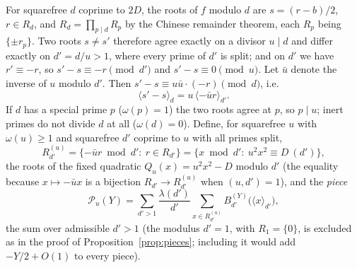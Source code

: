 \documentclass[11pt,a4paper]{article}
\theoremstyle{remark}\newtheorem{remark}[theorem]{Remark}
\newcommand{\rep}[2]{\langle #1\rangle_{#2}}
\begin{document}
For squarefree $d$ coprime to $2D$, the roots of $f$ modulo $d$ are $s=(r-b)/2$, $r\in R_d$, and $R_d=\prod_{p\mid d}R_p$
by the Chinese remainder theorem, each $R_p$ being $\{\pm r_p\}$. Two roots $s\ne s'$ therefore agree exactly on a
divisor $u\mid d$ and differ exactly on $d'=d/u>1$, where every prime of $d'$ is split; and on $d'$ we have
$r'\equiv-r$, so $s'-s\equiv-r\pmod{d'}$ and $s'-s\equiv0\pmod u$. Let $\bar u$ denote the inverse of $u$
modulo $d'$. Then $s'-s\equiv u\bar u\cdot(-r)\pmod d$, i.e.
\begin{equation}\label{eq:m}
\rep{s'-s}d=u\,\rep{-\bar ur}{d'} .
\end{equation}
If $d$ has a special prime $p$ ($\omega(p)=1$) the two roots agree at $p$, so $p\mid u$; inert primes do not divide $d$
at all ($\omega(d)=0$). Define, for squarefree $u$ with $\omega(u)\ge1$ and squarefree $d'$ coprime to $u$ with all primes
split,
\[
R^{(u)}_{d'}=\{-\bar ur\bmod d':\ r\in R_{d'}\}=\{x\bmod d':\ u^2x^2\equiv D\ (d')\},
\]
the roots of the fixed quadratic $Q_u(x)=u^2x^2-D$ modulo $d'$ (the equality because $x\mapsto-\bar ux$ is a bijection
$R_{d'}\to R^{(u)}_{d'}$ when $(u,d')=1$), and the \emph{piece}
\begin{equation}\label{eq:piece}
\mathcal P_u(Y)=\sum_{d'>1}\frac{\lambda(d')}{d'}\sum_{x\in R^{(u)}_{d'}}B^{(Y)}_{d'}\bigl(\rep x{d'}\bigr),
\end{equation}
the sum over admissible $d'>1$ (the modulus $d'=1$, with $R_1=\{0\}$, is excluded as in the proof of
Proposition~\ref{prop:pieces}; including it would add $-Y/2+O(1)$ to every piece).
\end{document}
